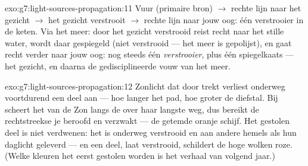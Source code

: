 \begin{solution}{exo:g7:light-sources-propagation:11}
Vuur (primaire bron) $\to$ rechte lijn naar het gezicht $\to$ het
gezicht verstrooit $\to$ rechte lijn naar jouw oog: één verstrooier in
de keten. Via het meer: door het gezicht verstrooid  reist recht
naar het stille water, wordt daar gespiegeld (niet verstrooid --- het
meer is gepolijst), en gaat recht verder naar jouw oog: nog steeds één
\emph{verstrooier}, plus één spiegelkaats --- het gezicht, en daarna de
gedisciplineerde vouw van het meer.
\end{solution}

\begin{solution}{exo:g7:light-sources-propagation:12}
Zonlicht dat door  trekt verliest onderweg voortdurend een deel
aan  --- hoe langer het pad, hoe groter de diefstal. Bij
 scheert het  van de Zon langs de
 over haar langste weg, dus bereikt de rechtstreekse
 je beroofd en verzwakt --- de getemde oranje schijf. Het
gestolen deel is niet verdwenen: het is onderweg verstrooid en aan
andere hemels als hun daglicht geleverd --- en een deel, laat
verstrooid, schildert de hoge wolken roze. (Welke kleuren het eerst
gestolen worden is het verhaal van volgend jaar.)
\end{solution}


